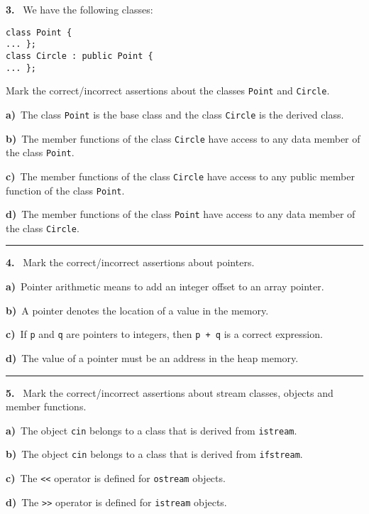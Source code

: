 \begin{multicols}{2}
{\bf 3. }\ We have the following classes:
 \vspace{-3mm}\begin{verbatim}
class Point {
... };
class Circle : public Point {
... };
 \end{verbatim}\vspace{-6mm}
Mark the correct/incorrect assertions about the classes
\verb|Point| and \verb|Circle|.

{\bf a)}\ The class \verb|Point| is the base class and the class \verb|Circle| is the derived class.

{\bf b)}\ The member functions of the class \verb|Circle| have access to any data member of the class \verb|Point|.

{\bf c)}\ The member functions of the class \verb|Circle| have access to any public member function of the class \verb|Point|.

{\bf d)}\ The member functions of the class \verb|Point| have access to any data member of the class \verb|Circle|.

\par\smallskip\hrule\par\medskip

{\bf 4. }\ Mark the correct/incorrect assertions about pointers.

{\bf a)}\ Pointer arithmetic means to add an integer offset to an array pointer.

{\bf b)}\ A pointer denotes the location of a value in the memory.

{\bf c)}\ If \verb|p| and \verb|q| are pointers to integers, then \verb|p + q| is a correct expression.

{\bf d)}\ The value of a pointer must be an address in the heap memory.

\par\smallskip\hrule\par\medskip

{\bf 5. }\ Mark the correct/incorrect assertions about stream classes, objects and
member functions.

{\bf a)}\ The object \verb|cin| belongs to a class that is derived from \verb|istream|.

{\bf b)}\ The object \verb|cin| belongs to a class that is derived from \verb|ifstream|.

{\bf c)}\ The \verb|<<| operator is defined for \verb|ostream| objects.

{\bf d)}\ The \verb|>>| operator is defined for \verb|istream| objects.

\end{multicols}



